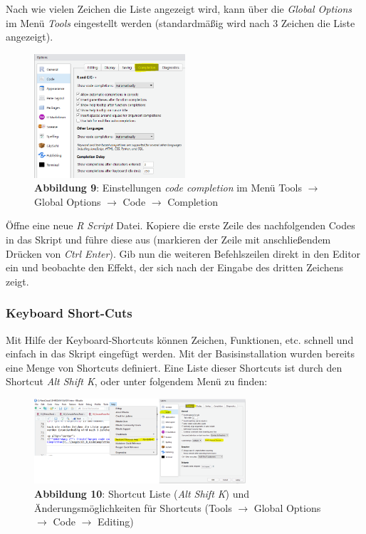 \documentclass[]{article}
\begin{document}
Nach wie vielen Zeichen die Liste angezeigt wird, kann über die
\emph{Global Options} im Menü \emph{Tools} eingestellt werden
(standardmäßig wird nach 3 Zeichen die Liste angezeigt).

\begin{figure}
\centering
\includegraphics[width=0.50000\textwidth]{Images/03_R_CodeCompletion.PNG}
\caption{\textbf{Abbildung 9}: Einstellungen \emph{code completion} im
Menü Tools \(\rightarrow\) Global Options \(\rightarrow\) Code
\(\rightarrow\) Completion}
\end{figure}

Öffne eine neue \emph{R Script} Datei. Kopiere die erste Zeile des
nachfolgenden Codes in das Skript und führe diese aus (markieren der
Zeile mit anschließendem Drücken von \emph{Ctrl Enter}). Gib nun die
weiteren Befehlszeilen direkt in den Editor ein und beobachte den
Effekt, der sich nach der Eingabe des dritten Zeichens zeigt.

\subsubsection*{Keyboard Short-Cuts}\label{keyboard-short-cuts}

Mit Hilfe der Keyboard-Shortcuts können Zeichen, Funktionen, etc.
schnell und einfach in das Skript eingefügt werden. Mit der
Basisinstallation wurden bereits eine Menge von Shortcuts definiert.
Eine Liste dieser Shortcuts ist durch den Shortcut \emph{Alt Shift K},
oder unter folgendem Menü zu finden:

\begin{figure}
\centering
\includegraphics[width=0.70000\textwidth]{Images/03_R_ShortCuts.PNG}
\caption{\textbf{Abbildung 10}: Shortcut Liste (\emph{Alt Shift K}) und
Änderungsmöglichkeiten für Shortcuts (Tools \(\rightarrow\) Global
Options \(\rightarrow\) Code \(\rightarrow\) Editing)}
\end{figure}
\end{document}
